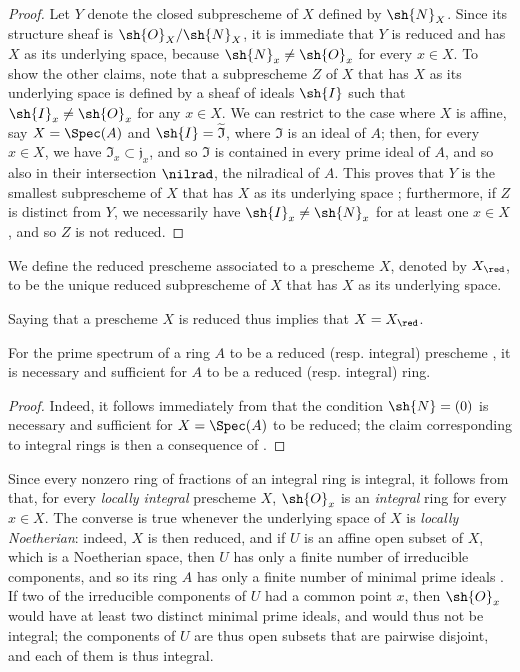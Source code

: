 \begin{proof}
Let $Y$ denote the closed subprescheme of $X$ defined by $\sh{N}_X$.
Since its structure sheaf is $\sh{O}_X/\sh{N}_X$, it is immediate that $Y$ is reduced and has $X$ as its underlying space, because $\sh{N}_x\neq\sh{O}_x$ for every $x\in X$.
To show the other claims, note that a subprescheme $Z$ of $X$ that has $X$ as its underlying space is defined by a sheaf of ideals $\sh{I}$  such that $\sh{I}_x\neq\sh{O}_x$ for any $x\in X$.
We can restrict to the case where $X$ is affine, say $X=\Spec(A)$ and $\sh{I}=\widetilde{\mathfrak{I}}$, where $\mathfrak{I}$ is an ideal of $A$;
then, for every $x\in X$, we have $\mathfrak{I}_x\subset\mathfrak{j}_x$, and so $\mathfrak{I}$ is contained in every prime ideal of $A$, and so also in their intersection $\nilrad$, the nilradical of $A$.
This proves that $Y$ is the smallest subprescheme of $X$ that has $X$ as its underlying space ;
furthermore, if $Z$ is distinct from $Y$, we necessarily have $\sh{I}_x\neq\sh{N}_x$ for at least one $x\in X$, and so  $Z$ is not reduced.
\end{proof}

\begin{definition}[5.1.3]
\label{I.5.1.3}
We define the reduced prescheme associated to a prescheme $X$, denoted by $X_\red$, to be the unique reduced subprescheme of $X$ that has $X$ as its underlying space.
\end{definition}

Saying that a prescheme $X$ is reduced thus implies that $X=X_\red$.

\begin{proposition}[5.1.4]
\label{I.5.1.4}
For the prime spectrum of a ring $A$ to be a reduced (resp. integral) prescheme , it is necessary and sufficient for $A$ to be a reduced (resp. integral) ring.
\end{proposition}

\begin{proof}
Indeed, it follows immediately from  that the condition $\sh{N}=(0)$ is necessary and sufficient for $X=\Spec(A)$ to be reduced;
the claim corresponding to integral rings is then a consequence of .
\end{proof}

Since every nonzero ring of fractions of an integral ring is integral, it follows from  that, for every \emph{locally integral} prescheme $X$, $\sh{O}_x$ is an \emph{integral} ring for every $x\in X$.
The converse is true whenever the underlying space of $X$ is \emph{locally Noetherian}:
indeed, $X$ is then reduced, and if $U$ is an affine open subset of $X$, which is a Noetherian space, then $U$ has only a finite number of irreducible components, and so its ring $A$ has only a finite number of minimal prime ideals .
If two of the irreducible components of $U$ had a common point $x$, then $\sh{O}_x$ would have at least two distinct minimal prime ideals, and would thus not be integral;
the components of $U$ are thus open subsets that are pairwise disjoint, and each of them is thus integral.

